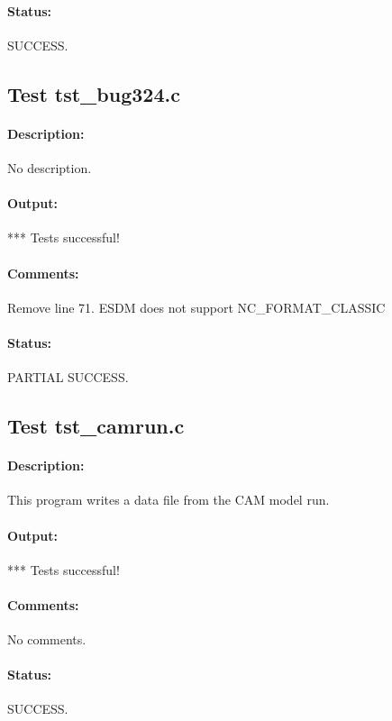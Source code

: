 \paragraph{Status:} SUCCESS.

\subsection{Test tst\_bug324.c}

\paragraph{Description:} No description.

\paragraph{Output:} *** Tests successful!

\paragraph{Comments:} Remove line 71. ESDM does not support NC\_FORMAT\_CLASSIC

\paragraph{Status:} PARTIAL SUCCESS.

\subsection{Test tst\_camrun.c}

\paragraph{Description:} This program writes a data file from the CAM model run.

\paragraph{Output:} *** Tests successful!

\paragraph{Comments:} No comments.

\paragraph{Status:} SUCCESS.

